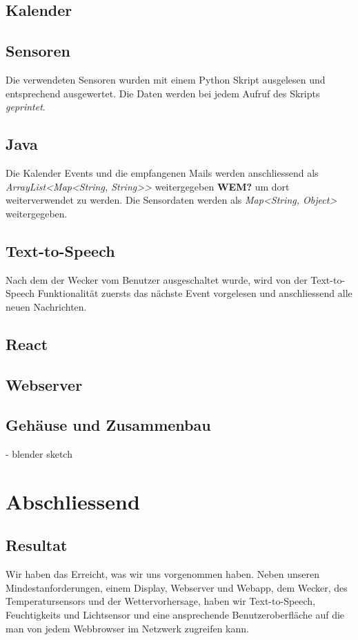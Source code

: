 \documentclass[11pt,a4paper]{article}
\begin{document}
\subsection{Kalender}


\subsection{Sensoren}
Die verwendeten Sensoren wurden mit einem Python Skript ausgelesen und entsprechend ausgewertet. Die Daten werden bei jedem Aufruf des Skripts \textit{geprintet}.

\subsection{Java}
Die Kalender Events und die empfangenen Mails werden anschliessend als \textit{ArrayList<Map<String, String>>} weitergegeben \textbf{WEM?} um dort weiterverwendet zu werden. Die Sensordaten werden als \textit{Map<String, Object>} weitergegeben.

\subsection{Text-to-Speech}
Nach dem der Wecker vom Benutzer ausgeschaltet wurde, wird von der Text-to-Speech Funktionalit\"at zuersts das n\"achste Event vorgelesen und anschliessend alle neuen Nachrichten.
\subsection{React}

\subsection{Webserver}

\subsection{Gehäuse und Zusammenbau}
- blender sketch

\section{Abschliessend}
\subsection{Resultat}
Wir haben das Erreicht, was wir uns vorgenommen haben. Neben unseren Mindestanforderungen, einem Display, Webserver und Webapp, dem Wecker, des Temperatursensors und der Wettervorhersage, haben wir Text-to-Speech, Feuchtigkeits und Lichtsensor und eine ansprechende Benutzeroberfläche auf die man von jedem Webbrowser im Netzwerk zugreifen kann.
\end{document}
